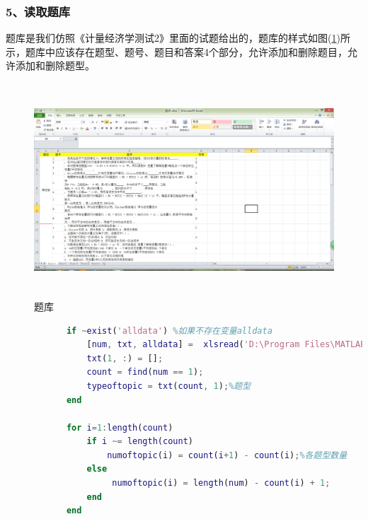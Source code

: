         \subsubsection{5、读取题库}
            题库是我们仿照《计量经济学测试2》里面的试题给出的，题库的样式如图(\ref{fig:题库})所示，题库中应该存在题型、题号、题目和答案4个部分，允许添加和删除题目，允许添加和删除题型。
            \begin{figure}[H]
            \centering
            \includegraphics[height=8cm]{images/QB.jpg}
            \caption{题库}
            \label{fig:题库}
            \end{figure}
            \begin{lstlisting}[language=Matlab]
            %%%%%%%%%%%%%%%读取题库(可以写到函数外面)%%%%%%%%%%%%%%%%%%%%%%
            if ~exist('alldata') %如果不存在变量alldata
                [num, txt, alldata] =  xlsread('D:\Program Files\MATLAB\R2014a\work\20计量经济作业解\题库.xlsx', 1);%应该将题库一直打开
                txt(1, :) = [];
                count = find(num == 1);
                typeoftopic = txt(count, 1);%题型
            end

            for i=1:length(count)
                if i ~= length(count)
                    numoftopic(i) = count(i+1) - count(i);%各题型数量
                else
                     numoftopic(i) = length(num) - count(i) + 1;
                end
            end
            \end{lstlisting}
